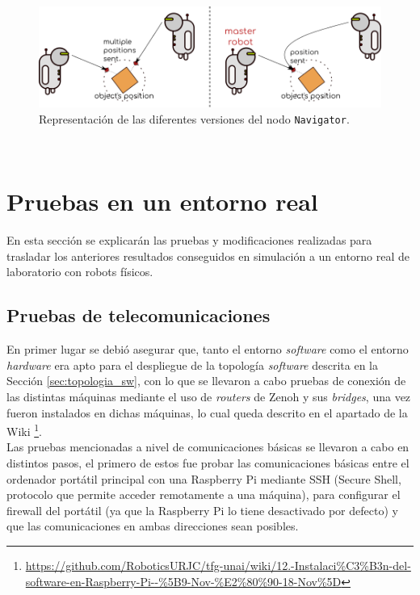 \begin{figure} [h!]
  \begin{center}
    \includegraphics[width=15cm]{figs/navigator_versions}
  \end{center}
  \caption{Representación de las diferentes versiones del nodo \texttt{Navigator}.}
  \label{fig:navigator_versions}
\end{figure}\



\section{Pruebas en un entorno real}
\label{sec:pruebas_real}

En esta sección se explicarán las pruebas y modificaciones realizadas para
trasladar los anteriores resultados conseguidos en simulación a un entorno real
de laboratorio con robots físicos.
\\

\subsection{Pruebas de telecomunicaciones}
\label{sec:pruebas_telecoms}

En primer lugar se debió asegurar que, tanto el entorno \textit{software} como
el entorno \textit{hardware} era apto para el despliegue de la topología
\textit{software} descrita en la Sección \ref{sec:topologia_sw}, con lo que se
llevaron a cabo pruebas de conexión de las distintas máquinas mediante el uso de
\textit{routers} de Zenoh y sus \textit{bridges}, una vez fueron instalados en
dichas máquinas, lo cual queda descrito en el apartado de la Wiki \footnote{
\url{https://github.com/RoboticsURJC/tfg-unai/wiki/12.-Instalaci\%C3\%B3n-del-software-en-Raspberry-Pi--\%5B9-Nov-\%E2\%80\%90-18-Nov\%5D}}.
\\

Las pruebas mencionadas a nivel de comunicaciones básicas se llevaron a cabo
en distintos pasos, el primero de estos fue probar las comunicaciones básicas
entre el ordenador portátil principal con una Raspberry Pi mediante SSH (Secure
Shell, protocolo que permite acceder remotamente a una máquina), para configurar
el firewall del portátil (ya que la Raspberry Pi lo tiene desactivado por
defecto) y que las comunicaciones en ambas direcciones sean posibles.
\\

